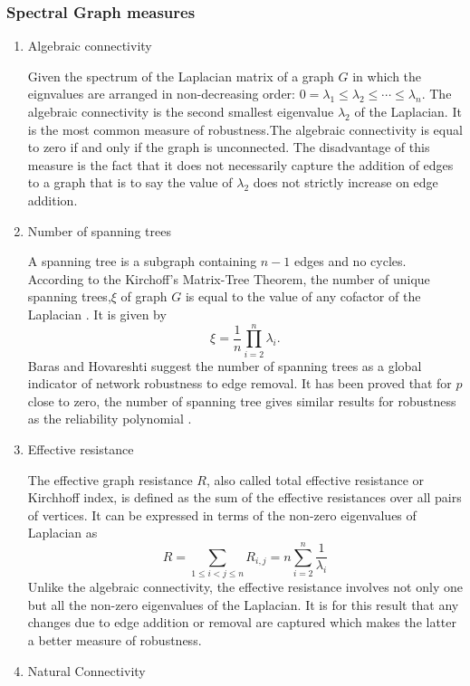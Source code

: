 \documentclass[10pt,a4paper]{article}
\theoremstyle{plain}
\theoremstyle{definition}
\begin{document}
	\subsubsection{Spectral Graph measures}
	\begin{enumerate}
		\item Algebraic connectivity
		
		Given the spectrum of the Laplacian matrix of a graph $G$ in which the eignvalues are arranged in non-decreasing order: $0=\lambda_1\leq \lambda_2 \leq \cdots \leq \lambda_n$. The algebraic connectivity is the second smallest eigenvalue $\lambda_2$ of the Laplacian. It is the most common measure of robustness.The algebraic connectivity is equal to zero if and only if the graph is unconnected. The disadvantage of this measure is the fact that it does not necessarily capture the addition of edges to a graph that is to say the value of $\lambda_2$ does not strictly increase on edge addition.
		\item Number of spanning trees
				
		A spanning tree is a subgraph containing $n-1$ edges and no cycles. According to the Kirchoff's Matrix-Tree Theorem, the number of unique spanning trees,$\xi$ of graph $G$ is equal to the value of any cofactor of the Laplacian \citep{harris2008combinatorics}. It  is given by
		\begin{equation}
		\xi = \frac{1}{n} \prod_{i=2}^{n} \lambda_i.
		\end{equation}
		Baras and Hovareshti suggest the number of spanning trees as a global indicator of network robustness to edge removal. It has been proved that for $p$ close to zero, the number of spanning tree gives similar results for robustness as the reliability polynomial \citep{baras2009efficient}.
		\item Effective resistance
		
		The effective graph resistance $R$, also called total effective resistance or Kirchhoff index, is
		defined as the sum of the effective resistances over all pairs of vertices. It can be expressed in terms of the non-zero eigenvalues of Laplacian as
		\begin{equation}
		R = \sum_{1\leq i < j \leq n} R_{i,j} = n \sum_{i=2}^{n} \frac{1}{\lambda_i}
		\end{equation}
		Unlike the algebraic connectivity, the effective resistance involves not only one but all the non-zero eigenvalues of the Laplacian. It is for this result that any changes due to edge addition or removal are captured which makes the latter a better measure of robustness.
		\item Natural Connectivity
		

\end{enumerate}
\end{document}
